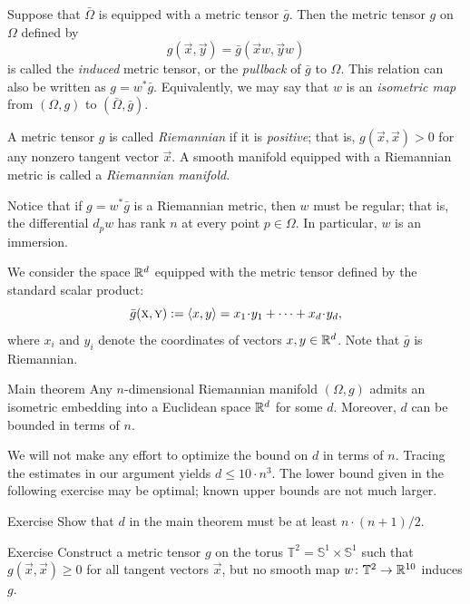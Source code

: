 Suppose that $\bar\Omega$ is equipped with a metric tensor $\bar g$.
Then the metric tensor $g$ on $\Omega$ defined by
\[g(\vec x, \vec y) = \bar g(\vec x w, \vec y w)\]
is called the \emph{induced} metric tensor, or the \emph{pullback} of $\bar g$ to $\Omega$.
This relation can also be written as $g = w^*\bar g$.
Equivalently, we may say that $w$ is an \emph{isometric map} from $(\Omega, g)$ to $(\bar\Omega, \bar g)$.

A metric tensor $g$ is called \emph{Riemannian} if it is \textit{positive};
that is, $g(\vec x, \vec x) > 0$ for any nonzero tangent vector $\vec x$.
A smooth manifold equipped with a Riemannian metric is called a \emph{Riemannian manifold}.

Notice that if $g = w^* \bar g$ is a Riemannian metric, then $w$ must be regular; that is, the differential $d_p w$ has rank $n$ at every point $p \in \Omega$.
In particular, $w$ is an immersion.

We consider the space $\mathbb{R}^d$ equipped with the metric tensor defined by the standard scalar product:
\[\bar g(\vec x, \vec y) \df \langle x, y \rangle = x_1 \cdot y_1 + \dots + x_d \cdot y_d,\]
where $x_i$ and $y_i$ denote the coordinates of vectors $x, y \in \mathbb{R}^d$.
Note that $\bar g$ is Riemannian.

\begin{thm}{Main theorem}\label{thm:main}
Any $n$-dimensional Riemannian manifold $(\Omega,g)$ admits an isometric embedding into a Euclidean space $\mathbb{R}^d$ for some $d$.
Moreover, $d$ can be bounded in terms of $n$.
\end{thm}

We will not make any effort to optimize the bound on $d$ in terms of $n$.
Tracing the estimates in our argument yields $d \le 10 \cdot n^3$.
The lower bound given in the following exercise may be optimal; known upper bounds are not much larger.

\begin{thm}{Exercise}\label{ex:n(n+1)/2}
Show that $d$ in the main theorem must be at least $n \cdot (n+1)/2$.
\end{thm}

\begin{thm}{Exercise}\label{ex:notinduced}
Construct a metric tensor $g$ on the torus $\mathbb{T}^2 = \mathbb{S}^1 \times \mathbb{S}^1$ such that $g(\vec x, \vec x) \ge 0$ for all tangent vectors $\vec x$,
but no smooth map $w\colon\mathbb{T}^2 \to \mathbb{R}^{10}$ induces $g$.
\end{thm}


